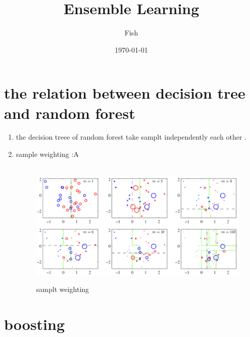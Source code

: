 \documentclass[12pt]{ctexart}%
\title{\kaishu Ensemble Learning}
\author{Fish}
\date{\today}
\begin{document}
	\maketitle
	\renewcommand{\contentsname}{Content} %
	\tableofcontents
	\clearpage
	\pagestyle{fancy}
	
	\section{\quad the relation between decision tree and random forest}
		\begin{enumerate}
			\item the decision treee of random forest take samplt independently each other .
			\item sample weighting :A
				\begin{figure}[H]
					\vspace{-0.2cm}  %
					\setlength{\abovecaptionskip}{-0.2cm}   %
					\centering
					\includegraphics[scale=0.4]{sample_weighting.png}
					\renewcommand{\figurename}{Fig} %
					\caption{samplt weighting}
					\label{fig:1}
				\end{figure}
		\end{enumerate}
	
	\section{\quad boosting}
\end{document}
